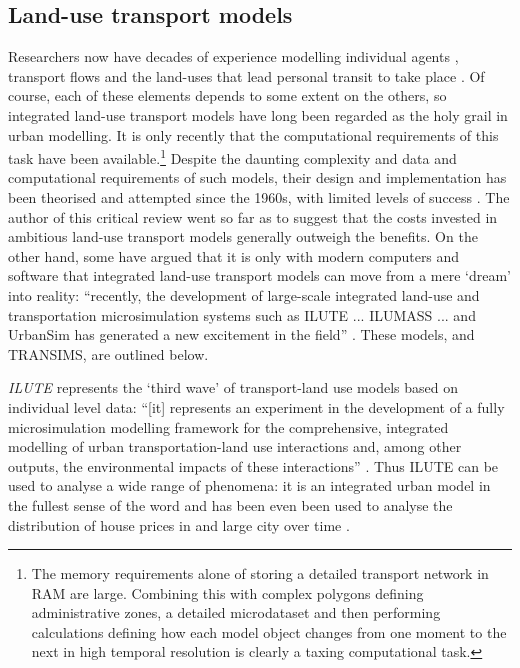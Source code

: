 \documentclass[a4paper, 11pt, twoside]{Thesis}
\begin{document}
\subsection{Land-use transport models}
Researchers now have decades of experience modelling individual agents
\citep{Ortuzar1982},
transport flows \citep{Wilson1970} and the land-uses that lead personal
transit to take place \citep{batty1976urban}.
Of course, each of these elements depends to some extent on the others, so
integrated land-use transport models have long been regarded as the holy grail
in urban modelling. It is only recently that the computational
requirements of this task have been
available.\footnote{The memory requirements alone of storing a detailed
transport network in RAM are large. Combining this with complex polygons
defining administrative zones, a detailed microdataset and then performing
calculations defining how each model object changes from one moment to the next
in high temporal resolution is clearly a taxing computational task.
}
Despite the daunting complexity and data and computational requirements of such
models, their design and implementation has been theorised and attempted
since the 1960s, with limited levels of success
\citep{timmermans2003saga}. The author of this critical review went so far as
to suggest that the costs invested in ambitious land-use transport models
generally outweigh the benefits.
On the other hand, some have argued that it is only with modern computers and software
that integrated land-use transport models can move from a mere
`dream' \citep{timmermans2003saga}  into reality: ``recently,
the development of large-scale integrated land-use and
transportation microsimulation systems such as ILUTE ... ILUMASS
... and UrbanSim has generated a new excitement in the field'' \citep[p.~935]{Pinjari2011}.
These models, and TRANSIMS, are outlined below.


\emph{ILUTE}  represents the `third wave' of transport-land use
models based on individual level data:
``[it] represents an experiment in the development of a
fully microsimulation modelling
framework for the comprehensive, integrated modelling of urban transportation-land use
interactions and, among other outputs, the environmental impacts of these interactions''
\citep[p.~15]{timmermans2003saga}. Thus ILUTE can be used to analyse a wide range
of phenomena: it is an integrated urban model in the fullest sense of the word
and has been even been used to analyse the distribution of house prices
in and large city over time \citep{Farooq2012-integreted}.
\end{document}
